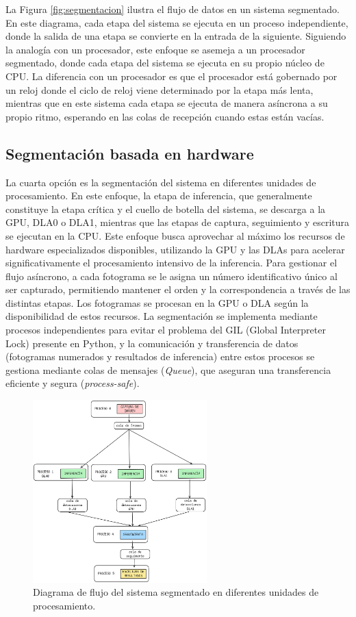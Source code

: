 \documentclass[11pt,spanish,listoffigures,listoftables]{tfgetsinf}
\begin{document}
La Figura \ref{fig:segmentacion} ilustra el flujo de datos en un sistema segmentado. En este diagrama, cada etapa del sistema se ejecuta en un proceso independiente, donde la salida de una etapa se convierte en la entrada de la siguiente. Siguiendo la analogía con un procesador, este enfoque se asemeja a un procesador segmentado, donde cada etapa del sistema se ejecuta en su propio núcleo de CPU. La diferencia con un procesador es que el procesador está gobernado por un reloj donde el ciclo de reloj viene determinado por la etapa más lenta, mientras que en este sistema cada etapa se ejecuta de manera asíncrona a su propio ritmo, esperando en las colas de recepción cuando estas están vacías.

\subsection{Segmentación basada en hardware}
La cuarta opción es la segmentación del sistema en diferentes unidades de procesamiento. En este enfoque, la etapa de inferencia, que generalmente constituye la etapa crítica y el cuello de botella del sistema, se descarga a la GPU, DLA0 o DLA1, mientras que las etapas de captura, seguimiento y escritura se ejecutan en la CPU. Este enfoque busca aprovechar al máximo los recursos de hardware especializados disponibles, utilizando la GPU y las DLAs para acelerar significativamente el procesamiento intensivo de la inferencia. Para gestionar el flujo asíncrono, a cada fotograma se le asigna un número identificativo único al ser capturado, permitiendo mantener el orden y la correspondencia a través de las distintas etapas. Los fotogramas se procesan en la GPU o DLA según la disponibilidad de estos recursos. La segmentación se implementa mediante procesos independientes para evitar el problema del GIL (Global Interpreter Lock) presente en Python, y la comunicación y transferencia de datos (fotogramas numerados y resultados de inferencia) entre estos procesos se gestiona mediante colas de mensajes (\textit{Queue}), que aseguran una transferencia eficiente y segura (\textit{process-safe}).

\begin{figure}[H]
   \centering
   \includegraphics[width=0.6\textwidth]{images/diseno_e_implementacion/segmentacion_multihardware.png}
   \caption{Diagrama de flujo del sistema segmentado en diferentes unidades de procesamiento.}
   \label{fig:segmentacion_multihardware}
\end{figure}
\end{document}

